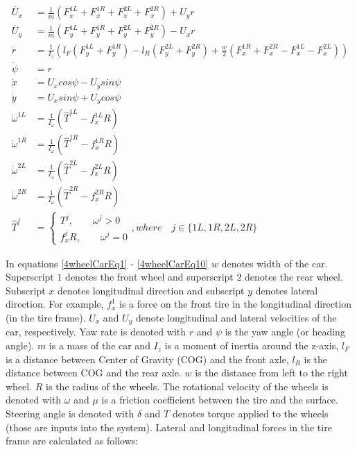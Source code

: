 \documentclass[paper=a4, fontsize=11pt]{scrartcl} %
\numberwithin{equation}{section} %
\numberwithin{figure}{section} %
\numberwithin{table}{section} %
\begin{document}
\begin{align}
\dot{{U_x}} &  = \frac{1}{m} \left( F_x^{1L} + F_x^{1R} + F_x^{2L} +F_x^{2R} \right) + U_yr \label{4wheelCarEq1}      \\
\dot{U_y}   & = \frac{1}{m} \left(F_y^{1L} + F_y^{1R} + F_y^{2L} + F_y^{2R}  \right)  - U_xr \\
\dot{r}  & = \frac{1}{I_z}  \left( l_F \left(F_y^{1L} + F_y^{1R} \right) -l_R \left(F_y^{2L} + F_y^{2R} \right) + \frac{w}{2}\left(F_x^{1R} + F_x^{2R} - F_x^{1L} - F_x^{2L} \right)    \right) \\
\dot{\psi}  & = r \\
\dot{x}  & = U_xcos\psi - U_ysin\psi \\
\dot{y}  & = U_xsin\psi + U_ycos\psi \\
\dot{\omega}^{1L}  & = \frac{1}{I_{\omega}}\left( \hat{T}^{1L} - f_x^{1L}R\right)  \\
\dot{\omega}^{1R}  & = \frac{1}{I_{\omega}}\left( \hat{T}^{1R} - f_x^{1R}R\right) \\ 
\dot{\omega}^{2L}  & = \frac{1}{I_{\omega}}\left( \hat{T}^{2L} - f_x^{2L}R\right)  \\
\dot{\omega}^{2R}  & = \frac{1}{I_{\omega}}\left( \hat{T}^{2R} - f_x^{2R}R\right) \label{4wheelCarEq10} \\ 
\hat{T}^j& = \begin{cases}   T^j, \qquad \omega^j > 0 \\
f_x^jR, \qquad \omega^j = 0 
\end{cases}, where \quad j \in \{1L, 1R, 2L, 2R \} \label{discontinuous}
\end{align}

In equations \ref{4wheelCarEq1} - \ref{4wheelCarEq10} $w$ denotes width of the car. Superscript $1$ denotes the front wheel and superscript $2$ denotes the rear wheel. Subscript $x$ denotes longitudinal direction and subscript $y$ denotes lateral direction. For example, $f^1_x$ is a force on the front tire in the longitudinal direction (in the tire frame). $U_x$ and $U_y$ denote longitudinal and lateral velocities of the car, respectively. Yaw rate is denoted with $r$ and $\psi$ is the yaw angle (or heading angle). $m$ is a mass of the car and $I_z$ is a moment of inertia around the z-axis, $l_F$ is a distance between Center of Gravity (COG) and the front axle, $l_R$ is the distance between COG and the rear axle. $w$ is the distance from left to the right wheel. $R$ is the radius of the wheels. The rotational velocity of the wheels is denoted with $\omega$ and $\mu$ is a friction coefficient between the tire and the surface. Steering angle is denoted with $\delta$ and $T$ denotes torque applied to the wheels (those are inputs into the system). Lateral and longitudinal forces in the tire frame are calculated as follows:
\end{document}
